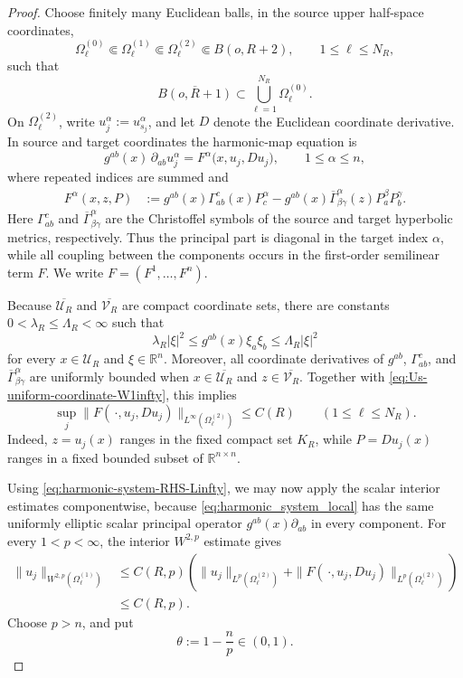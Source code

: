 \documentclass[11pt]{amsart}
\theoremstyle{plain}
\theoremstyle{plain}
\theoremstyle{plain}
\numberwithin{equation}{section}
\begin{document}
\begin{proof}
Choose finitely many Euclidean balls, in the source upper half-space
coordinates,
\[
\Omega_\ell^{(0)}\Subset\Omega_\ell^{(1)}
\Subset\Omega_\ell^{(2)}\Subset B(o,R+2),
\qquad 1\leq \ell\leq N_R,
\]
such that
\[
\overline{B(o,R+1)}
\subset \bigcup_{\ell=1}^{N_R}\Omega_\ell^{(0)}.
\]
On \(\Omega_\ell^{(2)}\), write
\(u_j^\alpha:=u_{s_j}^\alpha\), and let \(D\) denote the Euclidean
coordinate derivative.  In source and target coordinates the harmonic-map
equation is
\begin{equation}\label{eq:harmonic_system_local}
 g^{ab}(x)\,\partial_{ab}u_j^\alpha
 =F^\alpha\bigl(x,u_j,Du_j\bigr),
 \qquad 1\leq\alpha\leq n,
\end{equation}
where repeated indices are summed and
\begin{align}
F^\alpha(x,z,P)
&:=
 g^{ab}(x)\Gamma^c_{ab}(x)P_c^\alpha
 -g^{ab}(x)\overline\Gamma^\alpha_{\beta\gamma}(z)
   P_a^\beta P_b^\gamma.
\label{eq:harmonic-system-nonlinearity}
\end{align}
Here \(\Gamma^c_{ab}\) and
\(\overline\Gamma^\alpha_{\beta\gamma}\) are the Christoffel symbols
of the source and target hyperbolic metrics, respectively.  Thus the
principal part is diagonal in the target index \(\alpha\), while all
coupling between the components occurs in the first-order semilinear
term \(F\).  We write \(F=(F^1,\ldots,F^{n})\).

Because \(\overline{\mathcal U_R}\) and
\(\overline{\mathcal V_R}\) are compact coordinate sets, there are
constants \(0<\lambda_R\leq\Lambda_R<\infty\) such that
\[
 \lambda_R|\xi|^2
 \leq g^{ab}(x)\xi_a\xi_b
 \leq \Lambda_R|\xi|^2
\]
for every \(x\in\mathcal U_R\) and \(\xi\in\mathbb R^{n}\).  Moreover,
all coordinate derivatives of \(g^{ab}\), \(\Gamma^c_{ab}\), and
\(\overline\Gamma^\alpha_{\beta\gamma}\) are uniformly bounded when
\(x\in\overline{\mathcal U_R}\) and
\(z\in\overline{\mathcal V_R}\).  Together with
\eqref{eq:Us-uniform-coordinate-W1infty}, this implies
\begin{equation}\label{eq:harmonic-system-RHS-Linfty}
 \sup_j
 \bigl\|F(\,\cdot,u_j,Du_j)\bigr\|_{L^\infty(\Omega_\ell^{(2)})}
 \leq C(R)
 \qquad(1\leq\ell\leq N_R).
\end{equation}
Indeed, \(z=u_j(x)\) ranges in the fixed compact set \(K_R\), while
\(P=Du_j(x)\) ranges in a fixed bounded subset of
\(\mathbb R^{n\times n}\).

Using \eqref{eq:harmonic-system-RHS-Linfty}, we may now apply
the scalar interior estimates componentwise, because
\eqref{eq:harmonic_system_local} has the same uniformly elliptic scalar
principal operator \(g^{ab}(x)\partial_{ab}\) in every component.  For
every \(1<p<\infty\), the interior \(W^{2,p}\) estimate
\cite[Theorem~9.11 and its proof, pp.~235--236]{GilbargTrudinger} gives
\begin{align}
 \|u_j\|_{W^{2,p}(\Omega_\ell^{(1)})}
 &\leq C(R,p)
 \left(
 \|u_j\|_{L^p(\Omega_\ell^{(2)})}
 +\|F(\,\cdot,u_j,Du_j)\|_{L^p(\Omega_\ell^{(2)})}
 \right)\nonumber\\
 &\leq C(R,p).
\label{eq:harmonic-system-W2p}
\end{align}
Choose \(p>n\), and put
\[
\theta:=1-\frac{n}{p}\in(0,1).
\]


\end{proof}
\end{document}
